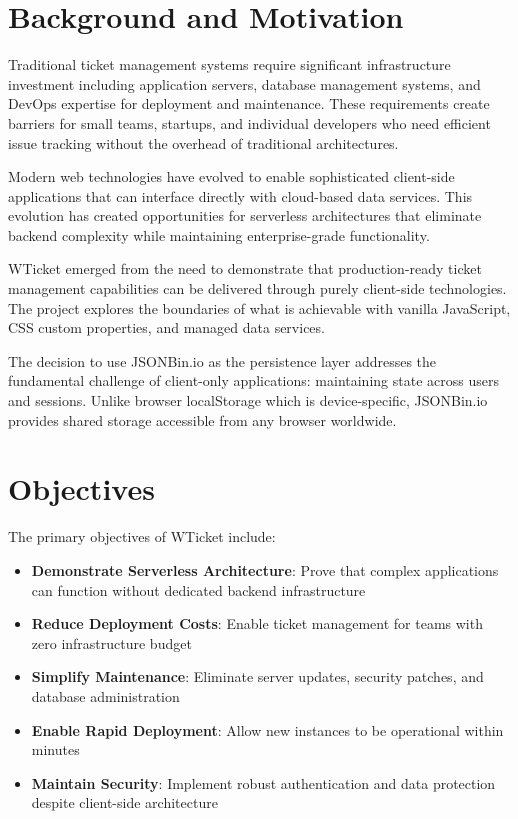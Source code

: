\documentclass[12pt,a4paper]{report}
\begin{document}
\section{Background and Motivation}
\label{sec:background}

Traditional ticket management systems require significant infrastructure investment including application servers, database management systems, and DevOps expertise for deployment and maintenance. These requirements create barriers for small teams, startups, and individual developers who need efficient issue tracking without the overhead of traditional architectures.

Modern web technologies have evolved to enable sophisticated client-side applications that can interface directly with cloud-based data services. This evolution has created opportunities for serverless architectures that eliminate backend complexity while maintaining enterprise-grade functionality.

WTicket emerged from the need to demonstrate that production-ready ticket management capabilities can be delivered through purely client-side technologies. The project explores the boundaries of what is achievable with vanilla JavaScript, CSS custom properties, and managed data services.

The decision to use JSONBin.io as the persistence layer addresses the fundamental challenge of client-only applications: maintaining state across users and sessions. Unlike browser localStorage which is device-specific, JSONBin.io provides shared storage accessible from any browser worldwide.

\section{Objectives}
\label{sec:objectives}

The primary objectives of WTicket include:

\begin{itemize}
    \item \textbf{Demonstrate Serverless Architecture}: Prove that complex applications can function without dedicated backend infrastructure
    \item \textbf{Reduce Deployment Costs}: Enable ticket management for teams with zero infrastructure budget
    \item \textbf{Simplify Maintenance}: Eliminate server updates, security patches, and database administration
    \item \textbf{Enable Rapid Deployment}: Allow new instances to be operational within minutes
    \item \textbf{Maintain Security}: Implement robust authentication and data protection despite client-side architecture
\end{itemize}
\end{document}
